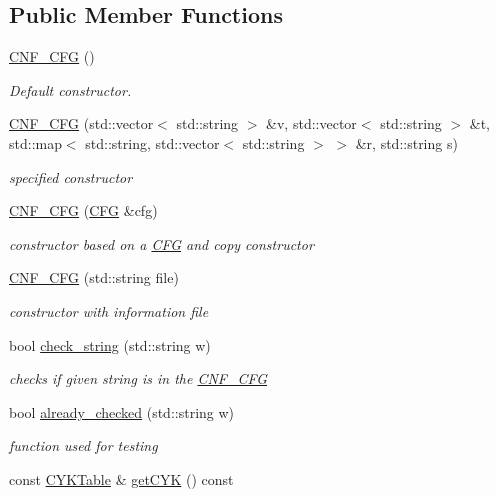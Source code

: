 \subsection*{\-Public \-Member \-Functions}
\begin{DoxyCompactItemize}
\item 
\hyperlink{classGrammar_1_1CNF__CFG_aa5850ca203f633fb16b4c74ea50e25f8}{\-C\-N\-F\-\_\-\-C\-F\-G} ()
\begin{DoxyCompactList}\small\item\em \-Default constructor. \end{DoxyCompactList}\item 
\hyperlink{classGrammar_1_1CNF__CFG_a9526886948355942d078fc55e69e73c7}{\-C\-N\-F\-\_\-\-C\-F\-G} (std\-::vector$<$ std\-::string $>$ \&v, std\-::vector$<$ std\-::string $>$ \&t, std\-::map$<$ std\-::string, std\-::vector$<$ std\-::string $>$ $>$ \&r, std\-::string s)
\begin{DoxyCompactList}\small\item\em specified constructor \end{DoxyCompactList}\item 
\hyperlink{classGrammar_1_1CNF__CFG_a88865800e932d5c81dae48d1be25adb7}{\-C\-N\-F\-\_\-\-C\-F\-G} (\hyperlink{classGrammar_1_1CFG}{\-C\-F\-G} \&cfg)
\begin{DoxyCompactList}\small\item\em constructor based on a \hyperlink{classGrammar_1_1CFG}{\-C\-F\-G} and copy constructor \end{DoxyCompactList}\item 
\hyperlink{classGrammar_1_1CNF__CFG_a90ddda4519a646b86ce74e5f7c66af1a}{\-C\-N\-F\-\_\-\-C\-F\-G} (std\-::string file)
\begin{DoxyCompactList}\small\item\em constructor with information file \end{DoxyCompactList}\item 
bool \hyperlink{classGrammar_1_1CNF__CFG_a446adcd68552aec1ee08f7058ac1c1e4}{check\-\_\-string} (std\-::string w)
\begin{DoxyCompactList}\small\item\em checks if given string is in the \hyperlink{classGrammar_1_1CNF__CFG}{\-C\-N\-F\-\_\-\-C\-F\-G} \end{DoxyCompactList}\item 
bool \hyperlink{classGrammar_1_1CNF__CFG_a55bd1300252f9c6bd506ae43738b7616}{already\-\_\-checked} (std\-::string w)
\begin{DoxyCompactList}\small\item\em function used for testing \end{DoxyCompactList}\item 
const \hyperlink{classGrammar_1_1CYKTable}{\-C\-Y\-K\-Table} \& \hyperlink{classGrammar_1_1CNF__CFG_aabfab26060664908edad6fa7d61bef37}{get\-C\-Y\-K} () const 
\end{DoxyCompactItemize}

